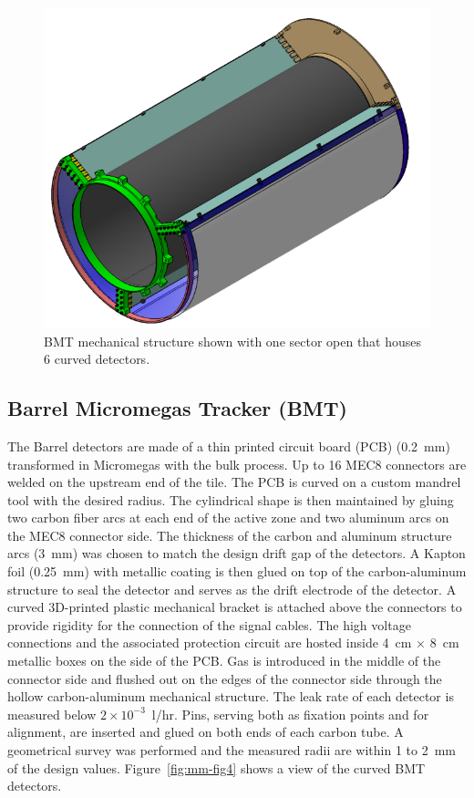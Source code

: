 \begin{figure}[htb]
 \includegraphics[width=1.0\columnwidth,keepaspectratio]{images/fig3}
 \caption{BMT mechanical structure shown with one sector open that houses 6 curved detectors.}
 \label{fig:mm-fig3}
\end{figure}

\subsection{Barrel Micromegas Tracker (BMT)}

The Barrel detectors are made of a thin printed circuit board (PCB) (0.2~mm) transformed in Micromegas with the bulk
process. Up to 16 MEC8 connectors are welded on the upstream end of the tile. The PCB is curved on a custom mandrel tool
with the desired radius. The cylindrical shape is then maintained by gluing two carbon fiber arcs at each end of the active
zone and two aluminum arcs on the MEC8 connector side. The thickness of the carbon and aluminum structure arcs (3~mm)
was chosen to match the design drift gap of the detectors. A Kapton foil (0.25~mm) with metallic coating is then glued on top
of the carbon-aluminum structure to seal the detector and serves as the drift electrode of the detector. A curved 3D-printed
plastic mechanical bracket is attached above the connectors to provide rigidity for the connection of the signal cables. The high
voltage connections and the associated protection circuit are hosted inside 4~cm $\times$ 8~cm metallic boxes on the side of
the PCB.  Gas is introduced in the middle of the connector side and flushed out on the edges of the connector side through the
hollow carbon-aluminum mechanical structure. The leak rate of each detector is measured below \(2\times10^{-3}\)~l/hr. Pins,
serving both as fixation points and for alignment, are inserted and glued on both ends of each carbon tube. A geometrical survey
was performed and the measured radii are within 1 to 2~mm of the design values. Figure~\ref{fig:mm-fig4} shows a view of the
curved BMT detectors.

